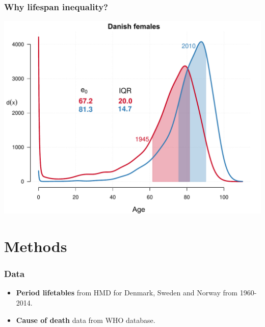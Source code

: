 \documentclass[xcolor={dvipsnames}]{beamer}
\begin{document}
\begin{frame}\frametitle{Why lifespan inequality?}

				\begin{center}
		\includegraphics[scale=.48]{Figures/Danish_distribution}
				\end{center}
				
\end{frame}



\section{Methods}


\begin{frame}\frametitle{Data}
\Large{
		\begin{itemize}
		
		\item \textbf{Period lifetables} from HMD for Denmark, Sweden and Norway from 1960-2014.

		\item \textbf{Cause of death} data from WHO database.
		
		\end{itemize}

}
\end{frame}
\end{document}
